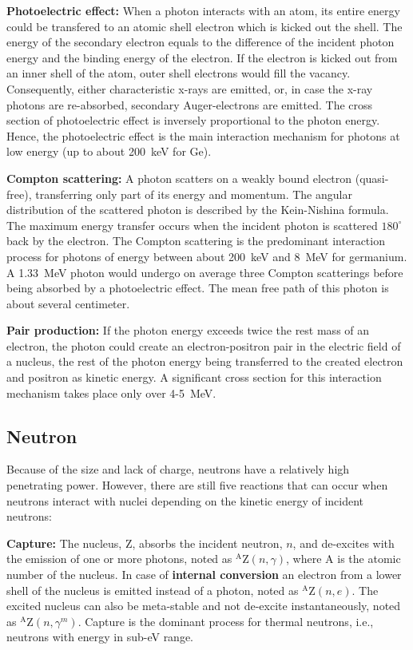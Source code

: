 \textbf{Photoelectric effect:} When a photon interacts with an atom, its entire energy could be transfered to an atomic shell electron which is kicked out the shell. The energy of the secondary electron equals to the difference of the incident photon energy and the binding energy of the electron. If the electron is kicked out from an inner shell of the atom, outer shell electrons would fill the vacancy. Consequently, either characteristic x-rays are emitted, or, in case the x-ray photons are re-absorbed, secondary Auger-electrons are emitted. The cross section of photoelectric effect is inversely proportional to the photon energy. Hence, the photoelectric effect is the main interaction mechanism for photons at low energy (up to about 200~keV for Ge).

\textbf{Compton scattering:} A photon scatters on a weakly bound electron (quasi-free), transferring only part of its energy and momentum. The angular distribution of the scattered photon is described by the Kein-Nishina formula. The maximum energy transfer occurs when the incident photon is scattered $180^{\circ}$ back by the electron. The Compton scattering is the predominant interaction process for photons of energy between about 200~keV and 8~MeV for germanium. A 1.33~MeV photon would undergo on average three Compton scatterings before being absorbed by a photoelectric effect. The mean free path of this photon is about several centimeter.

\textbf{Pair production:} If the photon energy exceeds twice the rest mass of an electron, the photon could create an electron-positron pair in the electric field of a nucleus, the rest of the photon energy being transferred to the created electron and positron as kinetic energy. A significant cross section for this interaction mechanism takes place only over 4-5~MeV.

\subsection{Neutron}
\label{sec:det:neutron}
Because of the size and lack of charge, neutrons have a relatively high penetrating power. However, there are still five reactions that can occur when neutrons interact with nuclei depending on the kinetic energy of incident neutrons:

\textbf{Capture:} The nucleus, Z, absorbs the incident neutron, $n$, and de-excites with the emission of one or more photons, noted as $^{\text{A}}$Z$(n,\gamma)$, where A is the atomic number of the nucleus. In case of \textbf{internal conversion} an electron from a lower shell of the nucleus is emitted instead of a photon, noted as $^{\text{A}}$Z$(n,e)$. The excited nucleus can also be meta-stable and not de-excite instantaneously, noted as $^{\text{A}}$Z$(n,\gamma^{m})$. Capture is the dominant process for thermal neutrons, \textup{i.e.}, neutrons with energy in sub-eV range.

